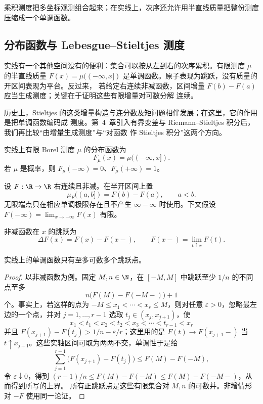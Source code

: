 乘积测度把多坐标观测组合起来；在实线上，次序还允许用半直线质量把整份测度压缩成一个单调函数。

\subsection{分布函数与 Lebesgue--Stieltjes 测度}\label{subsec:2-3-3}

实线有一个其他空间没有的便利：集合可以按从左到右的次序累积。有限测度 $\mu$ 的半直线质量
$F(x)=\mu(( -\infty,x])$ 是单调函数。原子表现为跳跃，没有质量的开区间表现为平台。反过来，
若给定右连续非减函数，区间增量 $F(b)-F(a)$ 应当生成测度；关键在于证明这些有限增量对可数分解
连续。

历史上，Stieltjes 的这类增量构造与连分数及矩问题相伴发展；在这里，它的作用是把单调函数编码成
测度。第~4~章引入有界变差与 Riemann--Stieltjes 积分后，我们再比较“由增量生成测度”与“对函数
作 Stieltjes 积分”这两个方向。

\begin{definition}[分布函数]\label{def:2-3-3-1}
实线上有限 Borel 测度 $\mu$ 的分布函数为
\[
 F_\mu(x)=\mu(( -\infty,x]).
\]
若 $\mu$ 是概率，则 $F_\mu(-\infty)=0$、$F_\mu(+\infty)=1$。
\end{definition}

\begin{definition}[Stieltjes 增量]\label{def:2-3-3-2}
设 $F:\R\to\R$ 右连续且非减。在半开区间上置
\[
 \mu_F((a,b])=F(b)-F(a),\qquad a<b.
\]
无限端点只在相应单调极限存在且不产生 $\infty-\infty$ 时使用。下文假设
$F(-\infty)=\lim_{x\to-\infty}F(x)$ 有限。
\end{definition}

\begin{definition}[跳跃]\label{def:2-3-3-3}
非减函数在 $x$ 的跳跃为
\[
 \Delta F(x)=F(x)-F(x-),\qquad F(x-)=\lim_{t\uparrow x}F(t).
\]
\end{definition}

\begin{proposition}[单调函数的跳跃至多可数]\label{proposition:2-3-3-1}
实线上的单调函数只有至多可数多个跳跃点。
\end{proposition}

\begin{proof}
以非减函数为例。固定 $M,n\in\N$，在 $[-M,M]$ 中跳跃至少 $1/n$ 的不同点至多
\[
 n\bigl(F(M)-F(-M-)\bigr)+1
\]
个。事实上，若这样的点为 $-M\le x_1<\cdots<x_r\le M$，则对任意
$\varepsilon>0$，忽略最左边的一个点，并对 $j=1,\ldots,r-1$ 选取
$t_j\in(x_j,x_{j+1})$，使
\[
 x_1<t_1<x_2<t_2<x_3<\cdots<t_{r-1}<x_r
\]
并且 $F(x_{j+1})-F(t_j)>1/n-\varepsilon/r$；这里用的是
$F(t)\to F(x_{j+1}-)$ 当 $t\uparrow x_{j+1}$。这些实轴区间可取为两两不交，单调性于是给
\[
 \sum_{j=1}^{r-1}\bigl(F(x_{j+1})-F(t_j)\bigr)
 \le F(M)-F(-M),
\]
令 $\varepsilon\downarrow0$，得到
$(r-1)/n\le F(M)-F(-M)\le F(M)-F(-M-)$，从而得到所写的上界。
所有正跳跃点是这些有限集合对 $M,n$ 的可数并。非增情形对 $-F$ 使用同一论证。
\end{proof}

